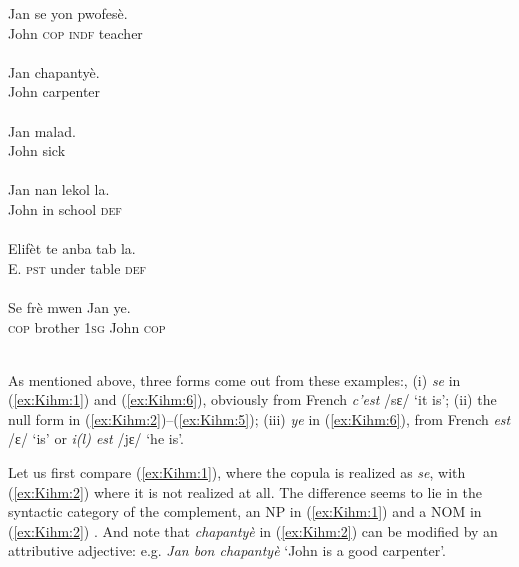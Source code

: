 \documentclass[output=paper]{langsci/langscibook}
\begin{document}
\begin{exe}
  \ex\label{ex:Kihm:1} \gll Jan se yon pwofesè.\\
  John \textsc{cop} \textsc{indf} teacher \\
  \glt {} \\

  \ex\label{ex:Kihm:2} \gll Jan chapantyè.\\
  John carpenter \\
  \glt {} \\

  \ex\label{ex:Kihm:3} \gll Jan malad.\\
  John sick \\
  \glt {} \\

  \ex\label{ex:Kihm:4} \gll Jan nan lekol la.\\
  John in school \textsc{def} \\
  \glt {} \\

  \ex\label{ex:Kihm:5} \gll Elifèt te anba tab la.\\
  E. \textsc{pst} under table \textsc{def} \\
  \glt {} \\

  \ex\label{ex:Kihm:6} \gll Se frè mwen Jan ye.\\
  \textsc{cop} brother \textsc{1sg} John \textsc{cop} \\
  \glt {} \\
\end{exe}

As mentioned above, three forms come out from these examples:, (i)
\emph{se} in (\ref{ex:Kihm:1}) and (\ref{ex:Kihm:6}), obviously from French \emph{c'est} /sɛ/ `it is'; (ii) the null form in (\ref{ex:Kihm:2})--(\ref{ex:Kihm:5}); (iii) \emph{ye} in (\ref{ex:Kihm:6}), from French
\emph{est} /ɛ/ `is' or \emph{i(l) est} /jɛ/ `he is'.

Let us first compare (\ref{ex:Kihm:1}), where the copula is realized as \emph{se},
with (\ref{ex:Kihm:2}) where it is not realized at all. The difference seems to lie in
the syntactic category of the complement, an NP in (\ref{ex:Kihm:1}) and a NOM in (\ref{ex:Kihm:2})
%
\citep[84]{Sag99}. %
%
And note that \emph{chapantyè} in (\ref{ex:Kihm:2}) can be
modified by an attributive adjective: e.g. \emph{Jan bon chapantyè}
`John is a good carpenter'.
\end{document}
